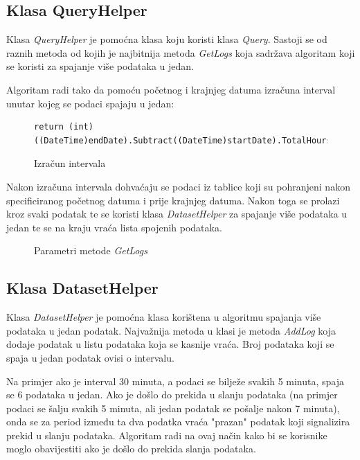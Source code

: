 \documentclass[zavrsnirad]{fer}
\begin{document}
\subsection{Klasa QueryHelper}
Klasa \textit{QueryHelper} je pomoćna klasa koju koristi klasa \textit{Query}. Sastoji se od raznih metoda od kojih je najbitnija metoda \textit{GetLogs} koja sadržava algoritam koji se koristi za spajanje više podataka u jedan.

Algoritam radi tako da pomoću početnog i krajnjeg datuma izračuna interval unutar kojeg se podaci spajaju u jedan:
\begin{figure}[htb]
	\centering
	\begin{lstlisting}[language=CSharp]
		return (int)((DateTime)endDate).Subtract((DateTime)startDate).TotalHours;
	\end{lstlisting}
	\caption{Izračun intervala}
\end{figure}
\FloatBarrier

Nakon izračuna intervala dohvaćaju se podaci iz tablice koji su pohranjeni nakon specificiranog početnog datuma i prije krajnjeg datuma. Nakon toga se prolazi kroz svaki podatak te se koristi klasa \textit{DatasetHelper} za spajanje više podataka u jedan te se na kraju vraća lista spojenih podataka.
\begin{figure}[htb]
	\centering
	
	\caption{Parametri metode \textit{GetLogs}}
	\label{GetLogs}
\end{figure}
\FloatBarrier

\subsection{Klasa DatasetHelper}
\label{pog:dataset_helper}
Klasa \textit{DatasetHelper} je pomoćna klasa korištena u algoritmu spajanja više podataka u jedan podatak. Najvažnija metoda u klasi je metoda \textit{AddLog} koja dodaje podatak u listu podataka koja se kasnije vraća. Broj podataka koji se spaja u jedan podatak ovisi o intervalu.

Na primjer ako je interval 30 minuta, a podaci se bilježe svakih 5 minuta, spaja se 6 podataka u jedan. Ako je došlo do prekida u slanju podataka (na primjer podaci se šalju svakih 5 minuta, ali jedan podatak se pošalje nakon 7 minuta), onda se za period između ta dva podatka vraća "prazan" podatak koji signalizira prekid u slanju podataka. Algoritam radi na ovaj način kako bi se korisnike moglo obavijestiti ako je došlo do prekida slanja podataka.
\end{document}
